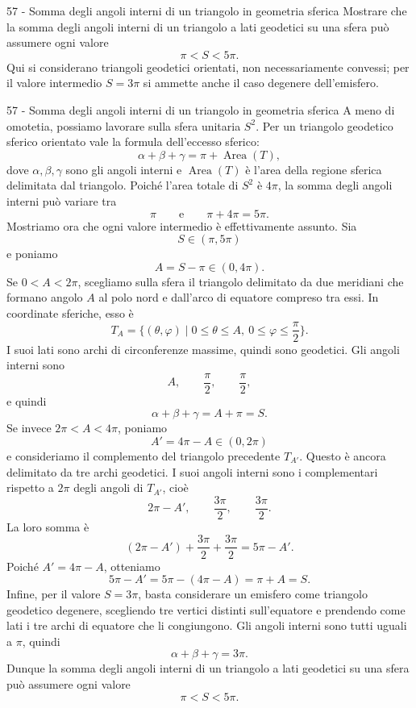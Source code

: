 \documentclass[a4paper]{article}
\begin{document}
\begin{snippetexercise}{57 - Somma degli angoli interni di un triangolo in
    geometria sferica}
    Mostrare che la somma degli angoli interni di un triangolo a lati
    geodetici su una sfera può assumere ogni valore
    \[
        \pi<S<5\pi.
    \]
    Qui si considerano triangoli geodetici orientati, non necessariamente
    convessi; per il valore intermedio \(S=3\pi\) si ammette anche il
    caso degenere dell'emisfero.
\end{snippetexercise}

\begin{snippetsolution}{57 - Somma degli angoli interni di un triangolo in
    geometria sferica}
    A meno di omotetia, possiamo lavorare sulla sfera unitaria \(S^2\). Per un triangolo geodetico sferico orientato vale la formula dell'eccesso sferico:
    \[
        \alpha+\beta+\gamma
        =
        \pi+\operatorname{Area}(T),
    \]
    dove \(\alpha,\beta,\gamma\) sono gli angoli interni e \(\operatorname{Area}(T)\) è l'area della regione sferica delimitata dal triangolo. Poiché l'area totale di \(S^2\) è \(4\pi\), la somma degli angoli interni può variare tra
    \[
        \pi
        \qquad\text{e}\qquad
        \pi+4\pi=5\pi.
    \]
    Mostriamo ora che ogni valore intermedio è effettivamente assunto. Sia
    \[
        S\in(\pi,5\pi)
    \]
    e poniamo
    \[
        A=S-\pi\in(0,4\pi).
    \]
    Se \(0<A<2\pi\), scegliamo sulla sfera il triangolo delimitato da due meridiani che formano angolo \(A\) al polo nord e dall'arco di equatore compreso tra essi. In coordinate sferiche, esso è
    \[
        T_A=
        \{(\theta,\varphi)\mid 0\leq \theta\leq A,\ 0\leq \varphi\leq \frac{\pi}{2}\}.
    \]
    I suoi lati sono archi di circonferenze massime, quindi sono geodetici. Gli angoli interni sono
    \[
        A,\qquad \frac{\pi}{2},\qquad \frac{\pi}{2},
    \]
    e quindi
    \[
        \alpha+\beta+\gamma=A+\pi=S.
    \]
    Se invece \(2\pi<A<4\pi\), poniamo
    \[
        A'=4\pi-A\in(0,2\pi)
    \]
    e consideriamo il complemento del triangolo precedente \(T_{A'}\). Questo è ancora delimitato da tre archi geodetici. I suoi angoli interni sono i complementari rispetto a \(2\pi\) degli angoli di \(T_{A'}\), cioè
    \[
        2\pi-A',
        \qquad
        \frac{3\pi}{2},
        \qquad
        \frac{3\pi}{2}.
    \]
    La loro somma è
    \[
        (2\pi-A')+\frac{3\pi}{2}+\frac{3\pi}{2}
        =
        5\pi-A'.
    \]
    Poiché \(A'=4\pi-A\), otteniamo
    \[
        5\pi-A'
        =
        5\pi-(4\pi-A)
        =
        \pi+A
        =
        S.
    \]
    Infine, per il valore \(S=3\pi\), basta considerare un emisfero come triangolo geodetico degenere, scegliendo tre vertici distinti sull'equatore e prendendo come lati i tre archi di equatore che li congiungono. Gli angoli interni sono tutti uguali a \(\pi\), quindi
    \[
        \alpha+\beta+\gamma=3\pi.
    \]
    Dunque la somma degli angoli interni di un triangolo a lati geodetici su una sfera può assumere ogni valore
    \[
        \pi<S<5\pi.
    \]
\end{snippetsolution}
\end{document}
